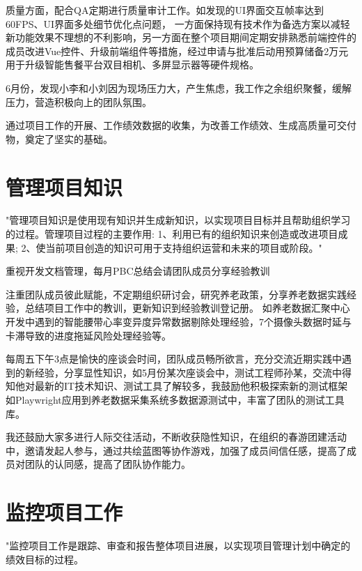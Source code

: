 \documentclass[UTF8]{../computerUniverse}
\begin{document}
质量方面，配合QA定期进行质量审计工作。如发现的UI界面交互帧率达到60FPS、UI界面多处细节优化点问题，
一方面保持现有技术作为备选方案以减轻新功能效果不理想的不利影响，另一方面在整个项目期间定期安排熟悉前端控件的成员改进Vue控件、升级前端组件等措施，经过申请与批准后动用预算储备2万元用于升级智能售餐平台双目相机、多屏显示器等硬件规格。

6月份，发现小李和小刘因为现场压力大，产生焦虑，我工作之余组织聚餐，缓解压力，营造积极向上的团队氛围。

通过项目工作的开展、工作绩效数据的收集，为改善工作绩效、生成高质量可交付物，奠定了坚实的基础。


\section{管理项目知识}
"管理项目知识是使用现有知识并生成新知识，以实现项目目标并且帮助组织学习的过程。管理项目过程的主要作用:
1、利用已有的组织知识来创造或改进项目成果;
2、使当前项目创造的知识可用于支持组织运营和未来的项目或阶段。"


重视开发文档管理，每月PBC总结会请团队成员分享经验教训

注重团队成员彼此赋能，不定期组织研讨会，研究养老政策，分享养老数据实践经验，总结项目工作中的教训，更新知识到经验教训登记册。
如养老数据汇聚中心开发中遇到的智能腰带心率变异度异常数据剔除处理经验，7个摄像头数据时延与卡滞导致的进度拖延风险处理经验等。

每周五下午3点是愉快的座谈会时间，团队成员畅所欲言，充分交流近期实践中遇到的新经验，分享显性知识，如5月份某次座谈会中，测试工程师孙某，交流中得知他对最新的IT技术知识、测试工具了解较多，我鼓励他积极探索新的测试框架如Playwright应用到养老数据采集系统多数据源测试中，丰富了团队的测试工具库。

我还鼓励大家多进行人际交往活动，不断收获隐性知识，在组织的春游团建活动中，邀请发起人参与，通过共绘蓝图等协作游戏，加强了成员间信任感，提高了成员对团队的认同感，提高了团队协作能力。



\section{监控项目工作}

"监控项目工作是跟踪、审查和报告整体项目进展，以实现项目管理计划中确定的绩效目标的过程。
\end{document}
